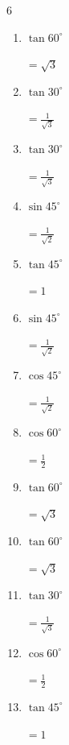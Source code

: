 \begin{multicols}{6}
\begin{enumerate}
  \item $\displaystyle \tan{60^\circ}$

        $\displaystyle =\sqrt{3}$

  \item $\displaystyle \tan{30^\circ}$

        $\displaystyle =\frac{1}{\sqrt{3}}$

  \item $\displaystyle \tan{30^\circ}$

        $\displaystyle =\frac{1}{\sqrt{3}}$

  \item $\displaystyle \sin{45^\circ}$

        $\displaystyle =\frac{1}{\sqrt{2}}$

  \item $\displaystyle \tan{45^\circ}$

        $\displaystyle =1$

  \item $\displaystyle \sin{45^\circ}$

        $\displaystyle =\frac{1}{\sqrt{2}}$

  \item $\displaystyle \cos{45^\circ}$

        $\displaystyle =\frac{1}{\sqrt{2}}$

  \item $\displaystyle \cos{60^\circ}$

        $\displaystyle =\frac{1}{2}$

  \item $\displaystyle \tan{60^\circ}$

        $\displaystyle =\sqrt{3}$

\columnbreak %

  \item $\displaystyle \tan{60^\circ}$

        $\displaystyle =\sqrt{3}$

  \item $\displaystyle \tan{30^\circ}$

        $\displaystyle =\frac{1}{\sqrt{3}}$

  \item $\displaystyle \cos{60^\circ}$

        $\displaystyle =\frac{1}{2}$

  \item $\displaystyle \tan{45^\circ}$

        $\displaystyle =1$


\end{enumerate}
\end{multicols}

